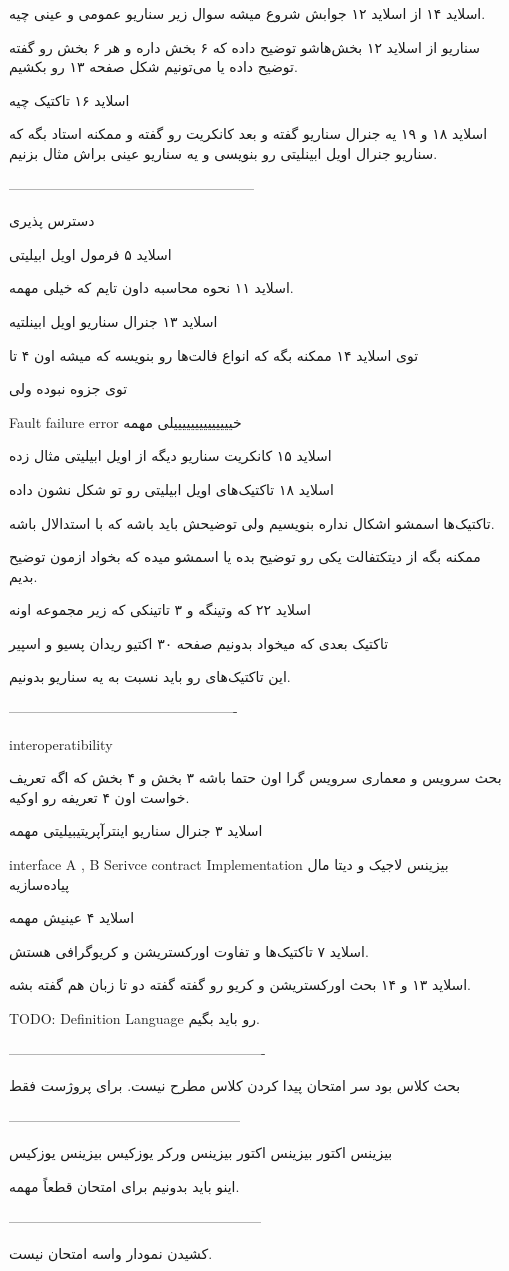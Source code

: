 اسلاید ۱۴ از اسلاید ۱۲ جوابش شروع میشه سوال زیر
سناریو عمومی و عینی چیه.

سناریو از اسلاید ۱۲ بخش‌هاشو توضیح داده که ۶ بخش داره و هر ۶ بخش رو گفته توضیح
داده یا می‌تونیم شکل صفحه ۱۳ رو بکشیم.

اسلاید ۱۶ تاکتیک چیه

اسلاید ۱۸ و ۱۹ یه جنرال سناریو گفته و بعد کانکریت رو گفته و ممکنه استاد بگه که
سناریو جنرال اویل ابینلیتی رو بنویسی و یه سناریو عینی براش مثال بزنیم.

-----------------------------------------------------

دسترس پذیری

اسلاید ۵ فرمول اویل ابیلیتی

اسلاید ۱۱ نحوه محاسبه داون تایم که خیلی مهمه.

اسلاید ۱۳ جنرال سناریو اویل ابینلتیه

توی اسلاید ۱۴ ممکنه بگه که انواع فالت‌ها رو بنویسه که میشه اون ۴ تا

توی جزوه نبوده ولی 

Fault failure error خییییییییییییییلی مهمه

اسلاید ۱۵ کانکریت سناریو دیگه از اویل ابیلیتی مثال زده

اسلاید ۱۸ تاکتیک‌های اویل ابیلیتی رو تو شکل نشون داده

تاکتیک‌ها اسمشو اشکال نداره بنویسیم ولی توضیحش باید باشه که با استدالال باشه.

ممکنه بگه از دیتکتفالت یکی رو توضیح بده یا اسمشو میده که بخواد ازمون توضیح بدیم.

اسلاید ۲۲ که وتینگه و ۳ تاتینکی که زیر مجموعه اونه

تاکتیک بعدی که میخواد بدونیم صفحه ۳۰ اکتیو ریدان پسیو و اسپیر

این تاکتیک‌های رو باید نسبت به یه سناریو بدونیم.

-------------------------------------------------

interoperatibility

بحث سرویس و معماری سرویس گرا اون حتما باشه ۳ بخش و ۴ بخش که اگه تعریف خواست اون
۴ تعریفه رو اوکیه.

اسلاید ۳ جنرال سناریو اینترآپریتیبیلیتی مهمه

interface A , B  Serivce contract Implementation
بیزینس لاجیک و دیتا مال پیاده‌سازیه

اسلاید ۴ عینیش مهمه

اسلاید ۷ تاکتیک‌ها و تفاوت اورکستریشن و کریوگرافی هستش.

اسلاید ۱۳ و ۱۴ بحث اورکستریشن و کریو رو گفته گفته دو تا زبان هم گفته بشه.

TODO:
Definition Language رو باید بگیم.

-------------------------------------------------------

بحث کلاس بود سر امتحان پیدا کردن کلاس مطرح نیست. برای پروژست فقط

--------------------------------------------------

بیزینس اکتور
بیزینس
اکتور
بیزینس ورکر
یوزکیس
بیزینس یوزکیس

اینو باید بدونیم برای امتحان قطعاً مهمه.

------------------------------------------------------

کشیدن نمودار واسه امتحان نیست.